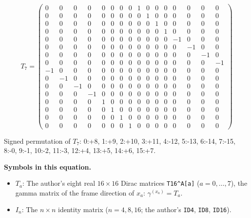 \documentclass[
  10pt,
]{article}
\providecommand{\tightlist}{%
  \setlength{\itemsep}{0pt}\setlength{\parskip}{0pt}}
\begin{document}
\[
T_7 = \scriptstyle \begin{pmatrix} 0 & 0 & 0 & 0 & 0 & 0 & 0 & 0 & 1 & 0 & 0 & 0 & 0 & 0 & 0 & 0 \\ 0 & 0 & 0 & 0 & 0 & 0 & 0 & 0 & 0 & 1 & 0 & 0 & 0 & 0 & 0 & 0 \\ 0 & 0 & 0 & 0 & 0 & 0 & 0 & 0 & 0 & 0 & 1 & 0 & 0 & 0 & 0 & 0 \\ 0 & 0 & 0 & 0 & 0 & 0 & 0 & 0 & 0 & 0 & 0 & 1 & 0 & 0 & 0 & 0 \\ 0 & 0 & 0 & 0 & 0 & 0 & 0 & 0 & 0 & 0 & 0 & 0 & -1 & 0 & 0 & 0 \\ 0 & 0 & 0 & 0 & 0 & 0 & 0 & 0 & 0 & 0 & 0 & 0 & 0 & -1 & 0 & 0 \\ 0 & 0 & 0 & 0 & 0 & 0 & 0 & 0 & 0 & 0 & 0 & 0 & 0 & 0 & -1 & 0 \\ 0 & 0 & 0 & 0 & 0 & 0 & 0 & 0 & 0 & 0 & 0 & 0 & 0 & 0 & 0 & -1 \\ -1 & 0 & 0 & 0 & 0 & 0 & 0 & 0 & 0 & 0 & 0 & 0 & 0 & 0 & 0 & 0 \\ 0 & -1 & 0 & 0 & 0 & 0 & 0 & 0 & 0 & 0 & 0 & 0 & 0 & 0 & 0 & 0 \\ 0 & 0 & -1 & 0 & 0 & 0 & 0 & 0 & 0 & 0 & 0 & 0 & 0 & 0 & 0 & 0 \\ 0 & 0 & 0 & -1 & 0 & 0 & 0 & 0 & 0 & 0 & 0 & 0 & 0 & 0 & 0 & 0 \\ 0 & 0 & 0 & 0 & 1 & 0 & 0 & 0 & 0 & 0 & 0 & 0 & 0 & 0 & 0 & 0 \\ 0 & 0 & 0 & 0 & 0 & 1 & 0 & 0 & 0 & 0 & 0 & 0 & 0 & 0 & 0 & 0 \\ 0 & 0 & 0 & 0 & 0 & 0 & 1 & 0 & 0 & 0 & 0 & 0 & 0 & 0 & 0 & 0 \\ 0 & 0 & 0 & 0 & 0 & 0 & 0 & 1 & 0 & 0 & 0 & 0 & 0 & 0 & 0 & 0 \end{pmatrix}
\]

Signed permutation of \(T_7\): 0:+8, 1:+9, 2:+10, 3:+11, 4:-12, 5:-13,
6:-14, 7:-15, 8:-0, 9:-1, 10:-2, 11:-3, 12:+4, 13:+5, 14:+6, 15:+7.

\textbf{Symbols in this equation.}

\begin{itemize}
\tightlist
\item
  \(T_a\): The author's eight real \(16 \times 16\) Dirac matrices
  \texttt{T16\^{}A{[}a{]}} (\(a = 0, \dots, 7\)), the gamma matrix of
  the frame direction of \(x_a\): \(\gamma^{(x_a)} = T_a\).
\item
  \(I_n\): The \(n \times n\) identity matrix (\(n = 4, 8, 16\); the
  author's \texttt{ID4}, \texttt{ID8}, \texttt{ID16}).
\end{itemize}
\end{document}
